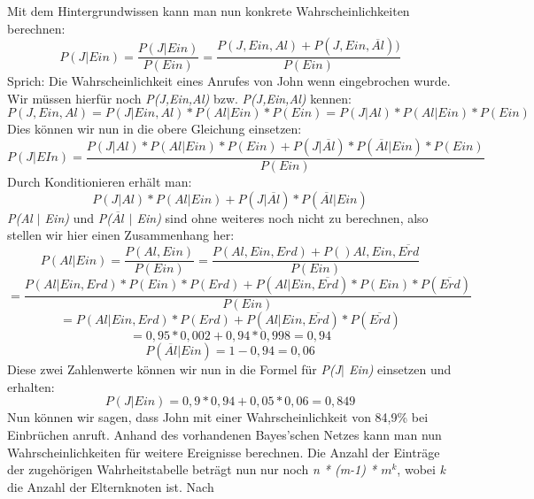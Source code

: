 Mit dem Hintergrundwissen kann man nun konkrete Wahrscheinlichkeiten berechnen:
\[ P(J\vert Ein) = \frac{P(J\vert Ein)}{P(Ein)}  = \frac{P(J,Ein,Al) + P(J,Ein, \overline{Al}))}{P(Ein)} \]
Sprich: Die Wahrscheinlichkeit eines Anrufes von John wenn eingebrochen wurde.
Wir müssen hierfür noch \textit{P(J,Ein,Al)} bzw. \textit{P(J,Ein,Al)} kennen:
\[ P(J, Ein, Al) = P(J\vert Ein, Al) * P(Al\vert Ein) * P(Ein) = P(J\vert Al) * P(Al\vert Ein) * P(Ein) \] 
Dies können wir nun in die obere Gleichung einsetzen:
\[ P(J\vert EIn) =  \frac{P(J\vert	Al) * P(Al\vert Ein) * P(Ein) + P(J\vert \overline{Al}) * P(\overline{Al} \vert Ein) * P(Ein) }{P(Ein)}  \]
Durch Konditionieren erhält man:
\[ P(J\vert Al) * P(Al\vert Ein) + P(J\vert \overline{Al}) * P(\overline{Al} \vert Ein) \]
\textit{P(Al $\vert$ Ein)} und \textit{P($\overline{Al}$ $\vert$ Ein)} sind ohne weiteres noch nicht zu berechnen, also stellen wir hier einen Zusammenhang her:
\[ P(Al\vert Ein) = \frac{P(Al, Ein)}{P(Ein)} = \frac{P(Al,Ein,Erd) + P()Al,Ein, \overline{Erd} }{P(Ein)}  \]
\[ = \frac{P(Al\vert Ein, Erd) * P(Ein) * P(Erd) + P(Al\vert Ein, \overline{Erd}) * P(Ein) * P(\overline{Erd}) }{P(Ein)}\]
\[ = P(Al\vert Ein, Erd) * P(Erd) + P(Al\vert Ein, \overline{Erd}) * P(\overline{Erd}) \]
\[ = 0,95 * 0,002 + 0,94 * 0,998 = 0,94 \]
\[ P(\overline{Al}\vert Ein) = 1-0,94 = 0,06 \]
Diese zwei Zahlenwerte können wir nun in die Formel für \textit{P(J$\vert$ Ein)} einsetzen und erhalten:
\[ P(J\vert Ein) = 0,9 * 0,94 + 0,05 * 0,06 = 0,849 \]
Nun können wir sagen, dass John mit einer Wahrscheinlichkeit von 84,9\% bei Einbrüchen anruft. Anhand des vorhandenen Bayes'schen Netzes kann man nun Wahrscheinlichkeiten für weitere Ereignisse berechnen. 
Die Anzahl der Einträge der zugehörigen Wahrheitstabelle beträgt nun nur noch \textit{n * (m-1) * $m^k$}, wobei \textit{k} die Anzahl der Elternknoten ist. Nach \cite{Ertel16}

